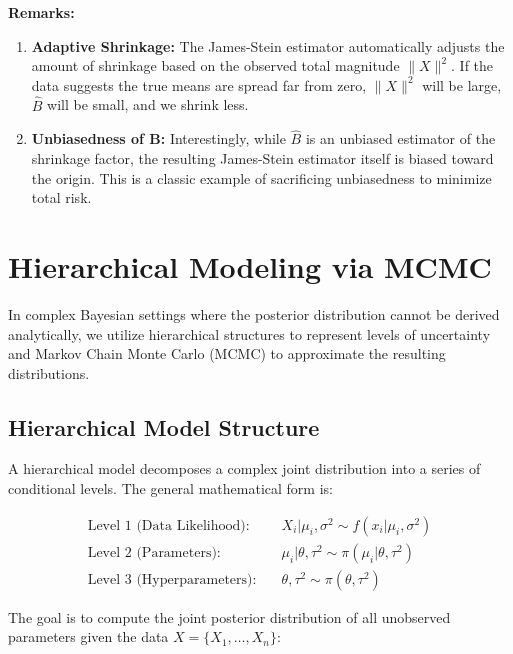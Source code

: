 \documentclass[
  letterpaper,
  DIV=11,
  numbers=noendperiod]{scrreprt}
\renewcommand{\[}{\begin{equation}}
\renewcommand{\]}{\end{equation}}
\theoremstyle{definition}
\theoremstyle{plain}
\theoremstyle{plain}
\theoremstyle{plain}
\theoremstyle{definition}
\theoremstyle{plain}
\theoremstyle{remark}
\begin{document}
\textbf{Remarks:}

\begin{enumerate}
\def\labelenumi{(\arabic{enumi})}
\item
  \textbf{Adaptive Shrinkage:} The James-Stein estimator automatically
  adjusts the amount of shrinkage based on the observed total magnitude
  \(\lVert X \rVert^2\). If the data suggests the true means are spread
  far from zero, \(\lVert X \rVert^2\) will be large, \(\hat{B}\) will
  be small, and we shrink less.
\item
  \textbf{Unbiasedness of B:} Interestingly, while \(\hat{B}\) is an
  unbiased estimator of the shrinkage factor, the resulting James-Stein
  estimator itself is biased toward the origin. This is a classic
  example of sacrificing unbiasedness to minimize total risk.
\end{enumerate}

\section{Hierarchical Modeling via
MCMC}\label{hierarchical-modeling-via-mcmc}

In complex Bayesian settings where the posterior distribution cannot be
derived analytically, we utilize hierarchical structures to represent
levels of uncertainty and Markov Chain Monte Carlo (MCMC) to approximate
the resulting distributions.

\subsection{Hierarchical Model
Structure}\label{hierarchical-model-structure}

A hierarchical model decomposes a complex joint distribution into a
series of conditional levels. The general mathematical form is:

\[
\begin{aligned}
\text{Level 1 (Data Likelihood):} & \quad X_i | \mu_i, \sigma^2 \sim f(x_i | \mu_i, \sigma^2) \\
\text{Level 2 (Parameters):} & \quad \mu_i | \theta, \tau^2 \sim \pi(\mu_i | \theta, \tau^2) \\
\text{Level 3 (Hyperparameters):} & \quad \theta, \tau^2 \sim \pi(\theta, \tau^2)
\end{aligned}
\]

The goal is to compute the joint posterior distribution of all
unobserved parameters given the data \(X = \{X_1, \dots, X_n\}\):
\end{document}
